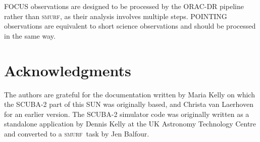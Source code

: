 \documentclass[twoside,11pt]{article}
\renewcommand{\_}{\texttt{\symbol{95}}}
\newcommand{\SMURF}{\textsc{smurf}}
\begin{document}
FOCUS observations are designed to be processed by the ORAC-DR
pipeline rather than \SMURF, as their analysis involves multiple
steps. POINTING observations are equivalent to short science
observations and should be processed in the same way.

\section{Acknowledgments}

The authors are grateful for the documentation written by Maria Kelly
on which the SCUBA-2 part of this SUN was originally based, and
Christa van Laerhoven for an earlier version. The SCUBA-2 simulator
code was originally written as a standalone application by Dennis
Kelly at the UK Astronomy Technology Centre and converted to a \SMURF\
task by Jen Balfour.

\end{document}
